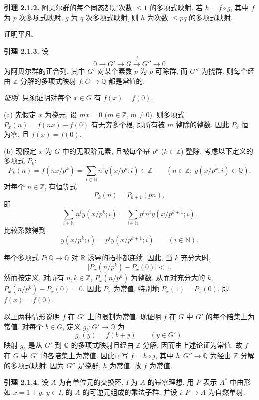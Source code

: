 \textbf{引理 2.1.2.} 阿贝尔群的每个同态都是次数 $\leq1$ 的多项式映射. 若 $h=f\circ g$, 其中 $f$ 为 $p$ 次多项式映射, $g$ 为 $q$ 次多项式映射, 则 $h$ 为次数 $\leq pq$ 的多项式映射.
%
%
%
%

证明平凡.

\textbf{引理 2.1.3.} 设
%
\[
0\longrightarrow G'\longrightarrow G\xrightarrow{j}G''\longrightarrow0
\]
为阿贝尔群的正合列, 其中 $G'$ 对某个素数 $p$ 为 $p$ 可除群, 而 $G''$ 为挠群. 则每个经由 $\mathbb Z$ 分解的多项式映射 $f:G\to\mathbb Q$ 都是常值的.
%
%

\emph{证明.} 只须证明对每个 $x\in G$ 有 $f(x)=f(0)$.
%

(a) 先假定 $x$ 为挠元, 设 $mx=0$ ($m\in\mathbb Z$, $m\ne0$). 则多项式 $P_x(n)=f(nx)-f(0)$ 有无穷多个根, 即所有被 $m$ 整除的整数. 因此 $P_x$ 恒为零, 且 $f(x)=f(0)$.
%
%
%

(b) 现假定 $x$ 为 $G$ 中的无限阶元素, 且被每个幂 $p^k$ ($k\in\mathbb Z$) 整除. 考虑以下定义的多项式 $P_k$:
%
\[
P_k(n)=f(nx/p^k)=\sum_{i\in\mathbb N}n^iy(x/p^k;i)\in\mathbb Z
\qquad(n\in\mathbb Z;\ y(x/p^k;i)\in\mathbb Q).
\]
对每个 $n\in\mathbb Z$, 有恒等式
\[
P_k(n)=P_{k+1}(pn),
\]
即
\[
\sum_{i\in\mathbb N}n^iy(x/p^k;i)=
\sum_{i\in\mathbb N}p^in^iy(x/p^{k+1};i).
\]
比较系数得到
\[
y(x/p^k;i)=p^iy(x/p^{k+1};i)\qquad(i\in\mathbb N).
\]

每个多项式 $P:\mathbb Q\to\mathbb Q$ 对 $\mathbb R$ 诱导的拓扑都连续. 因此, 当 $k$ 充分大时,
%
\[
\lvert P_x(n/p^k)-P_x(0)\rvert<1.
\]
然而按定义, 对所有 $n,k\in\mathbb Z$, $P_x(n/p^k)$ 为整数. 从而对充分大的 $k$, $P_x(n/p^k)-P_x(0)=0$. 因此 $P_x$ 为常值, 特别地 $P_x(1)=P_x(0)$, 即 $f(x)=f(0)$.
%
%
%

以上两种情形说明 $f$ 在 $G'$ 上的限制为常值. 现证明 $f$ 在 $G$ 中 $G'$ 的每个陪集上为常值. 对每个 $b\in G$, 定义 $g_b:G'\to\mathbb Q$ 为
%
%
\[
g_b(y)=f(b+y)\qquad(y\in G').
\]
映射 $g_b$ 是从 $G'$ 到 $\mathbb Q$ 的多项式映射且经由 $\mathbb Z$ 分解, 因而由上述论证为常值. 故 $f$ 在 $G$ 中 $G'$ 的各陪集上为常值. 因此可写 $f=h\circ j$, 其中 $h:G''\to\mathbb Q$ 为经由 $\mathbb Z$ 分解的多项式映射. 因为 $G''$ 是挠群, $h$ 为常值. 故 $f$ 为常值.
%
%
%
%
%

\textbf{引理 2.1.4.} 设 $A$ 为有单位元的交换环, $I$ 为 $A$ 的幂零理想. 用 $P$ 表示 $A^*$ 中由形如 $x=1+y$, $y\in I$, 的 $A$ 的可逆元组成的乘法子群, 并设 $i:P\to A$ 为自然单射.
%
%
%
%

